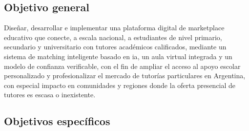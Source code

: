 \subsection{Objetivo general}\label{sec:objetivo-general}

Diseñar, desarrollar e implementar una plataforma digital de
\gls{marketplace} educativo que conecte, a escala nacional, a
estudiantes de nivel primario, secundario y universitario con tutores
académicos calificados, mediante un sistema de \gls{matching} inteligente
basado en \gls{ia}, un aula virtual integrada y un modelo de confianza
verificable, con el fin de ampliar el acceso al apoyo escolar
personalizado y profesionalizar el mercado de tutorías particulares en
Argentina, con especial impacto en comunidades y regiones donde la
oferta presencial de tutores es escasa o inexistente.

\subsection{Objetivos específicos}\label{sec:objetivos-especificos}


